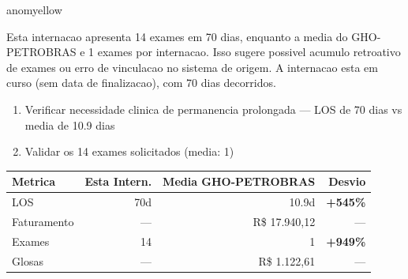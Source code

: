 \documentclass[a4paper,10pt]{article}
\begin{document}
\begin{anomalycard}[Internacao 161788 | GHO-PETROBRAS | MODERADO (z=2.01)]{anomyellow}
\vspace{2pt}\begin{tcolorbox}[colback=severityred!20,colframe=anomyellow,title={\textbf{Interpretacao de Negocio}},fonttitle=\bfseries\small,left=4pt,right=4pt,top=3pt,bottom=3pt]
{\small Esta internacao apresenta 14 exames em 70 dias, enquanto a media do GHO-PETROBRAS e 1 exames por internacao. Isso sugere possivel acumulo retroativo de exames ou erro de vinculacao no sistema de origem. A internacao esta em curso (sem data de finalizacao), com 70 dias decorridos.}
\end{tcolorbox}
\begin{tcolorbox}[colback=severityyellow!30,colframe=anomorange,title={\textbf{Recomendacoes Especificas}},fonttitle=\bfseries\small,left=4pt,right=4pt,top=3pt,bottom=3pt]
\begin{enumerate}[nosep,leftmargin=16pt]
\item {\small Verificar necessidade clinica de permanencia prolongada --- LOS de 70 dias vs media de 10.9 dias}
\item {\small Validar os 14 exames solicitados (media: 1)}
\end{enumerate}
\end{tcolorbox}
\begin{center}\begin{tabular}{l r r r}\toprule\textbf{Metrica} & \textbf{Esta Intern.} & \textbf{Media GHO-PETROBRAS} & \textbf{Desvio} \\\midrule
LOS & 70d & 10.9d & \textcolor{anomred}{\textbf{+545\%}} \\
Faturamento & --- & R\$ 17.940,12 & --- \\
Exames & 14 & 1 & \textcolor{anomred}{\textbf{+949\%}} \\
Glosas & --- & R\$ 1.122,61 & --- \\
\bottomrule\end{tabular}\end{center}


\end{anomalycard}
\end{document}
